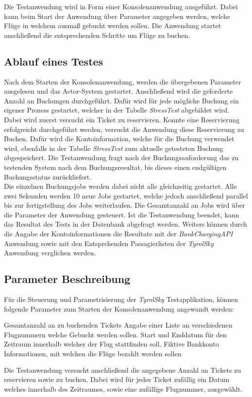 Die Testanwendung wird in Form einer Konsolenanwendung ausgeführt. Dabei kann beim Start der Anwendung über Parameter angegeben werden, welche Flüge in welchem ausmaß gebucht werden sollen. Die Anwendung startet anschließend die entsprechenden Schritte um Flüge zu buchen. 

\subsection{Ablauf eines Testes}
Nach dem Starten der Konsolenanwendung, werden die übergebenen Parameter ausgelesen und das Actor-System gestartet. Anschließend wird die geforderte Anzahl an Buchungen durchgeführt. Dafür wird für jede mögliche Buchung ein eigener Prozess gestartet, welcher in der Tabelle \textit{StressTest} abgebildet wird. Dabei wird zuerst versucht ein Ticket zu reservieren. Konnte eine Reservierung erfolgreicht durchgeführt werden, versucht die Anwendung diese Reservierung zu Buchen. Dafür wird die Kontoinformation, welche für die Buchung verwendet wird, ebenfalls in der Tabelle \textit{StressTest} zum aktuelle getesteten Buchung abgespeichert. Die Testanwendung fragt nach der Buchungsauforderung das zu testenden System nach dem Buchungsresultat, bis dieses einen endgültigen Buchungsstatus zurückliefert. \\
Die einzelnen Buchungsjobs werden dabei nicht alle gleichzeitig gestartet. Alle zwei Sekunden werden 10 neue Jobs gestartet, welche jedoch anschließend parallel bis zur fertigstellung des Jobs weiterlaufen. Die Gesamtanzahl an Jobs wird über die Parameter der Anwendung gesteuert. Ist die Testanwendung beendet, kann das Resultat des Tests in der Datenbank abgefragt werden. Weiters können durch die Angabe der Kontoinformationen die Resultate mit der \textit{BankChargingAPI} Anwendung sowie mit den Entsprchenden Passagierlisten der \textit{TyrolSky} Anwendung verglichen werden.

\subsection{Parameter Beschreibung}
Für die Steuerung und Parametrisierung der \textit{TyrolSky} Testapplikation, können folgende Parameter zum Starten  der Konsolenanwendung angewandt werden:

\begin{itemize}
     Gesamtanzahl an zu buchenden Tickets
     Angabe einer Liste an verschiedenen Flugnummern welche Gebucht werden sollen.
     Start und Enddatum für den Zeitraum innerhalb welcher der Flug stattfinden soll.
     Fiktive Bankkonto Informationen, mit welchen die Flüge bezahlt werden sollen
\end{itemize}
Die Testanwendung versucht anschließend die angegebene Anzahl an Tickets zu reservieren sowie zu buchen. Dabei wird für jedes Ticket zufällig ein Datum welches innerhalb des Zeitraumes, sowie eine zufällige Flugnummer, ausgewählt. 
